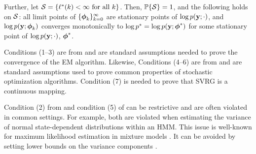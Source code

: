 \begin{theorem}
    Further, let $\mathcal{S} = \{\ell^*(k) < \infty \text{ for all } k \}$. Then, $\mathbb{P}\{\mathcal{S}\} = 1$, and the following holds on $\mathcal{S}$: all limit points of $\{\boldsymbol{\phi}_{k}\}_{k=0}^\infty$  are stationary points of $\log p(\mathbf{y};\cdot)$, and $\log p(\mathbf{y};\boldsymbol{\phi}_{k})$ converges monotonically to $\log p^* = \log p(\mathbf{y};\boldsymbol{\phi}^*)$ for some stationary point of $\log p(\mathbf{y};\cdot)$, $\boldsymbol{\phi}^*$.
\end{theorem}
%




Conditions (1--3) are from \citet{Wu:1983} and are standard assumptions needed to prove the convergence of the EM algorithm. Likewise, Conditions (4--6) are from \citet{Johnson:2013} and are standard assumptions used to prove common properties of stochastic optimization algorithms. Condition (7) is needed to prove that SVRG is a continuous mapping.

Condition (2) from \citet{Wu:1983} and condition (5) of \citet{Johnson:2013} can be restrictive and are often violated in common settings. For example, both are violated when estimating the variance of normal state-dependent distributions within an HMM. This issue is well-known for maximum likelihood estimation in mixture models \citep{Chen:2009,Liu:2015b}. It can be avoided by setting lower bounds on the variance components \citep{Zucchini:2016}. %

